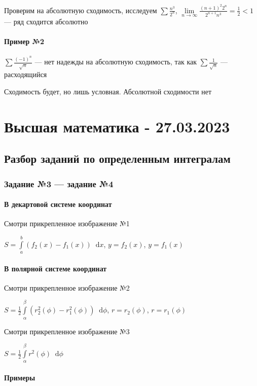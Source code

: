 \documentclass{article}
\newcommand*\diff{\mathop{}\!\mathrm{d}}
\begin{document}
Проверим на абсолютную сходимость, исследуем $\sum \frac{n^3}{2^{n}}$, $\lim\limits_{n \to \infty} \frac{(n + 1)^2 2^{n}}{2^{n + 1} n^3} = \frac{1}{2} < 1$ — ряд сходится абсолютно

\paragraph{Пример №2} $\sum \frac{(-1)^{n}}{\sqrt{n}}$ — нет надежды на абсолютную сходимость, так как $\sum \frac{1}{\sqrt{n}}$ — расходящийся

Сходимость будет, но лишь условная. Абсолютной сходимости нет

\pagebreak
\section{Высшая математика - 27.03.2023}

\subsection{Разбор заданий по определенным интегралам}

\subsubsection{Задание №3 — задание №4}

\paragraph{В декартовой системе координат}

Смотри прикрепленное изображение №1

$S = \int\limits_{a}^{b} (f_2(x) - f_1(x)) \diff x$, $y = f_2(x)$, $y = f_1(x)$

\paragraph{В полярной системе координат}

Смотри прикрепленное изображение №2

$S = \frac{1}{2} \int\limits_{\alpha}^{\beta} (r_2^2(\phi) - r_1^2(\phi)) \diff \phi$, $r = r_2(\phi)$, $r = r_1(\phi)$

\hfill

Смотри прикрепленное изображение №3

$S = \frac{1}{2} \int\limits_{\alpha}^{\beta} r^2(\phi) \diff \phi$

\paragraph{Примеры}
\end{document}
